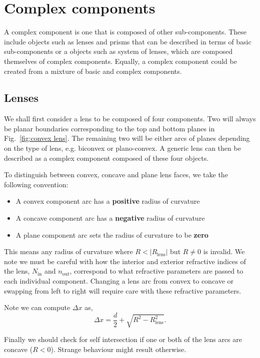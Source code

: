 \documentclass{article}
\begin{document}
\section{Complex components}
A complex component is one that is composed of other sub-components. These include objects such as lenses and prisms that can be described in terms of basic sub-components or a objects such as system of lenses, which are composed themselves of complex components. Equally, a complex component could be created from a mixture of basic and complex components.

\subsection{Lenses}
We shall first consider a lens to be composed of four components. Two will always be planar boundaries corresponding to the top and bottom planes in Fig.~\ref{fig:convex lens}. The remaining two will be either arcs of planes depending on the type of lens, e.g. biconvex or plano-convex. A generic lens can then be described as a complex component composed of these four objects.

To distinguish between convex, concave and plane lens faces, we take the following convention:
\begin{itemize}
    \item A convex component arc has a \textbf{positive} radius of curvature
    \item A concave component arc has a \textbf{negative} radius of curvature
    \item A plane component arc sets the radius of curvature to be \textbf{zero}
\end{itemize}
This means any radius of curvature where $R < |R_\mathrm{lens}|$ but $R \neq 0$ is invalid. We note we must be careful with how the interior and exterior refractive indices of the lens, $N_\mathrm{in}$ and $n_\mathrm{out}$, correspond to what refractive parameters are passed to each individual component. Changing
a lens arc from convex to concave or swapping from left to right will require care with these refractive parameters.

Note we can compute $\Delta x$ as,
\begin{equation}
    \Delta x = \frac{d}{2} + \sqrt{R^2 - R_\mathrm{lens}^2}.
\end{equation}

Finally we should check for self intersection if one or both of the lens arcs are concave ($R<0$). Strange behaviour might result otherwise.
\end{document}
